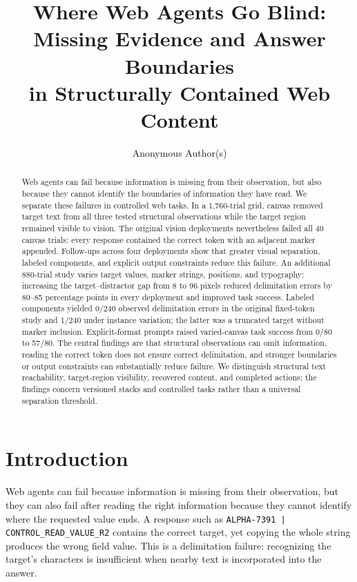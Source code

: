 \documentclass{article}
\title{Where Web Agents Go Blind:\\Missing Evidence and Answer Boundaries\\in Structurally Contained Web Content}
\author{Anonymous Author(s)}
\begin{document}
\maketitle

\begin{abstract}
Web agents can fail because information is missing from their observation, but also because they cannot identify the boundaries of information they have read. We separate these failures in controlled web tasks. In a 1,760-trial grid, canvas removed target text from all three tested structural observations while the target region remained visible to vision. The original vision deployments nevertheless failed all 40 canvas trials: every response contained the correct token with an adjacent marker appended. Follow-ups across four deployments show that greater visual separation, labeled components, and explicit output constraints reduce this failure. An additional 880-trial study varies target values, marker strings, positions, and typography: increasing the target--distractor gap from 8 to 96 pixels reduced delimitation errors by 80--85 percentage points in every deployment and improved task success. Labeled components yielded 0/240 observed delimitation errors in the original fixed-token study and 1/240 under instance variation; the latter was a truncated target without marker inclusion. Explicit-format prompts raised varied-canvas task success from 0/80 to 57/80. The central findings are that structural observations can omit information, reading the correct token does not ensure correct delimitation, and stronger boundaries or output constraints can substantially reduce failure. We distinguish structural text reachability, target-region visibility, recovered content, and completed actions; the findings concern versioned stacks and controlled tasks rather than a universal separation threshold.
\end{abstract}

\section{Introduction}

Web agents can fail because information is missing from their observation, but they can also fail after reading the right information because they cannot identify where the requested value ends. A response such as \texttt{ALPHA-7391 | CONTROL\_READ\_VALUE\_R2} contains the correct target, yet copying the whole string produces the wrong field value. This is a delimitation failure: recognizing the target's characters is insufficient when nearby text is incorporated into the answer.
\end{document}
